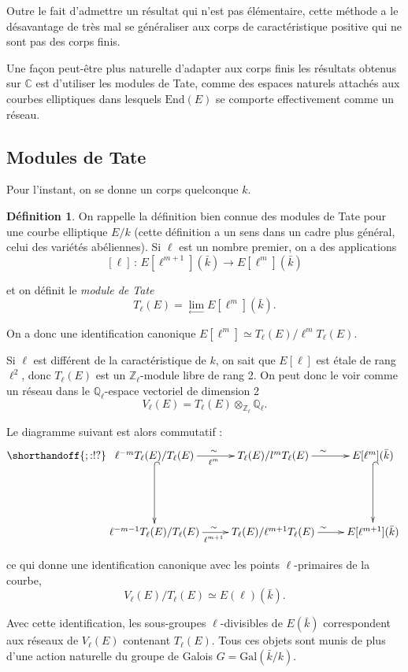 \documentclass[11pt,a4paper]{article}
\newcommand{\Z}{\mathbb{Z}}
\newcommand{\C}{\mathbb{C}}
\newcommand{\Q}{\mathbb{Q}}
\newcommand{\vers}{\longrightarrow}
\newcommand{\End}{\mathrm{End}}
\newcommand{\de}{\,:\,}
\theoremstyle{definition}
\newtheorem*{defi}{Définition}
\begin{document}
Outre le fait d'admettre un résultat qui n'est pas élémentaire, cette méthode a le désavantage de très mal se généraliser aux corps de caractéristique positive qui ne sont pas des corps finis.

Une façon peut-être plus naturelle d'adapter aux corps finis les résultats obtenus sur $\C$ est d'utiliser les modules de Tate, comme des espaces naturels attachés aux courbes elliptiques dans lesquels $\End(E)$ se comporte effectivement comme un réseau.




\newpage

\subsection{Modules de Tate}


Pour l'instant, on se donne un corps quelconque $k$.

\begin{defi}

On rappelle la définition bien connue des modules de Tate pour une courbe elliptique $E/k$ (cette définition a un sens dans un cadre plus général, celui des variétés abéliennes). Si $\ell$ est un nombre premier, on a des applications
$$ [\ell] \de E[\ell^{m+1}](\bar{k})\vers E[\ell^{m}](\bar{k})$$

et on définit le \emph{module de Tate}
$$T_\ell(E) = \lim_{\leftarrow} E[\ell^m](\bar{k}).$$

On a donc une identification canonique $E[\ell^m]\simeq T_\ell(E)/ \ell^{m} T_\ell(E)$.

Si $\ell$ est différent de la caractéristique de $k$, on sait que $E[\ell]$ est étale de rang $\ell^2$, donc $T_\ell(E)$ est un $\Z_\ell$-module libre de rang 2. On peut donc le voir comme un réseau dans le $\Q_\ell$-espace vectoriel de dimension 2
$$V_\ell(E) = T_\ell(E) \otimes_{\Z_\ell} \Q_\ell.$$

Le diagramme suivant est alors commutatif :
$$
\shorthandoff{;:!?}
\xymatrix {
\ell^{-m} T_\ell(E)/ T_\ell(E) \ar[r]_{\ell^m}^{\sim} \ar@{^{(}->}[dd]&
 T_\ell(E)/ l^m T_\ell(E) \ar[r]^{\sim}  & 
 E[\ell^m](\bar{k}) \ar@{^{(}->}[dd] \\ 
 \\
 \ell^{-m-1} T_\ell(E)/ T_\ell(E) \ar[r]_{\ell^{m+1}}^{\sim} &
 T_\ell(E)/ \ell^{m+1} T_\ell(E) \ar[r]^{\sim}  & 
 E[\ell^{m+1}](\bar{k})
}
$$

ce qui donne une identification canonique avec les points $\ell$-primaires de la courbe,
$$ V_\ell(E)/ T_\ell(E) \simeq E(\ell)(\bar{k}).$$

Avec cette identification, les sous-groupes $\ell$-divisibles de $E(\bar{k})$ correspondent aux réseaux de $V_\ell(E)$ contenant $T_\ell(E)$. Tous ces objets sont munis de plus d'une action naturelle du groupe de Galois $G= \mathrm{Gal}(\bar{k}/k)$.

\end{defi}
\end{document}
